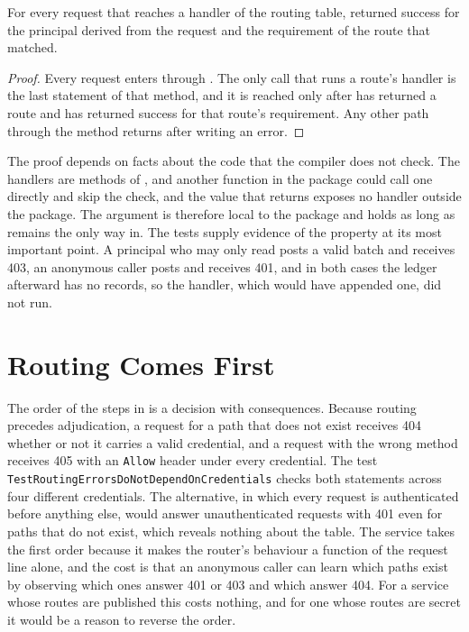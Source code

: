 \begin{proposition}\label{prop:permitted}
For every request that reaches a handler of the routing table,  returned success for the principal derived from the request and the requirement of the route that matched.
\end{proposition}

\begin{proof}
Every request enters through . The only call that runs a route's handler is the last statement of that method, and it is reached only after  has returned a route and  has returned success for that route's requirement. Any other path through the method returns after writing an error.
\end{proof}

The proof depends on facts about the code that the compiler does not check. The handlers are methods of , and another function in the package could call one directly and skip the check, and the value that  returns exposes no handler outside the package. The argument is therefore local to the package and holds as long as  remains the only way in. The tests supply evidence of the property at its most important point. A principal who may only read posts a valid batch and receives 403, an anonymous caller posts and receives 401, and in both cases the ledger afterward has no records, so the handler, which would have appended one, did not run.

\section{Routing Comes First}

The order of the steps in  is a decision with consequences. Because routing precedes adjudication, a request for a path that does not exist receives 404 whether or not it carries a valid credential, and a request with the wrong method receives 405 with an \texttt{Allow} header under every credential. The test \texttt{Test\-Routing\-Errors\-Do\-Not\-Depend\-On\-Credentials} checks both statements across four different credentials. The alternative, in which every request is authenticated before anything else, would answer unauthenticated requests with 401 even for paths that do not exist, which reveals nothing about the table. The service takes the first order because it makes the router's behaviour a function of the request line alone, and the cost is that an anonymous caller can learn which paths exist by observing which ones answer 401 or 403 and which answer 404. For a service whose routes are published this costs nothing, and for one whose routes are secret it would be a reason to reverse the order.

